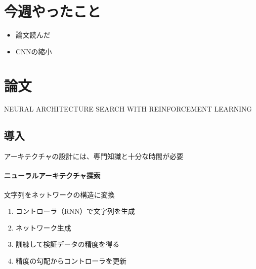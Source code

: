 \documentclass[twocolumn]{jarticle}     %
\begin{document}


\section{今週やったこと}
\begin{itemize}
	\item {論文読んだ}
	\item {CNNの縮小}
\end{itemize}

\section{論文}
NEURAL ARCHITECTURE SEARCH WITH REINFORCEMENT LEARNING
\subsection{導入}
アーキテクチャの設計には、専門知識と十分な時間が必要

\paragraph{ニューラルアーキテクチャ探索}
文字列をネットワークの構造に変換
\begin{enumerate}
  \item コントローラ（RNN）で文字列を生成
  \item ネットワーク生成
  \item 訓練して検証データの精度を得る
  \item 精度の勾配からコントローラを更新
\end{enumerate}

%
%
\end{document}
